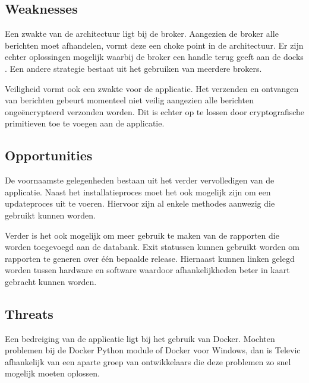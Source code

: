 \subsection{Weaknesses}
Een zwakte van de architectuur ligt bij de broker.
Aangezien de broker alle berichten moet afhandelen, vormt deze een choke point in de architectuur.
Er zijn echter oplossingen mogelijk waarbij de broker een handle terug geeft aan de docks \citep{adler1995distributed}. 
Een andere strategie bestaat uit het gebruiken van meerdere brokers.

Veiligheid vormt ook een zwakte voor de applicatie.
Het verzenden en ontvangen van berichten gebeurt momenteel niet veilig aangezien alle berichten ongeëncrypteerd verzonden worden.
Dit is echter op te lossen door cryptografische primitieven toe te voegen aan de applicatie.

\subsection{Opportunities}
De voornaamste gelegenheden bestaan uit het verder vervolledigen van de applicatie.
Naast het installatieproces moet het ook mogelijk zijn om een updateproces uit te voeren.
Hiervoor zijn al enkele methodes aanwezig die gebruikt kunnen worden.

Verder is het ook mogelijk om meer gebruik te maken van de rapporten die worden toegevoegd aan de databank.
Exit statussen kunnen gebruikt worden om rapporten te generen over één bepaalde release.
Hiernaast kunnen linken gelegd worden tussen hardware en software waardoor afhankelijkheden beter in kaart gebracht kunnen worden.

\subsection{Threats}
Een bedreiging van de applicatie ligt bij het gebruik van Docker.
Mochten problemen bij de Docker Python module of Docker voor Windows, dan is Televic afhankelijk van een aparte groep van ontwikkelaars die deze problemen zo snel mogelijk moeten oplossen.


